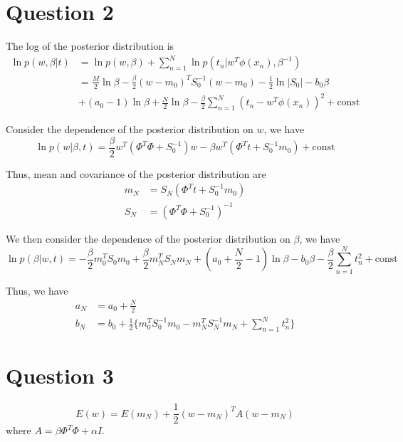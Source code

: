 \documentclass[a4paper,12pt]{article}
\begin{document}
\section*{Question 2}

The log of the posterior distribution is
\begin{align*}
	\ln p(w, \beta | t) &= \ln p(w, \beta) + \sum_{n=1}^{N} \ln p(t_n | w^T \phi(x_n), \beta^{-1}) \\
	&= \frac{M}{2} \ln \beta - \frac{\beta}{2} (w - m_0)^T S_0^{-1} (w - m_0) - \frac{1}{2} \ln |S_0| - b_0 \beta \\
	&+ (a_0 - 1) \ln \beta + \frac{N}{2} \ln \beta - \frac{\beta}{2} \sum_{n=1}^{N} (t_n - w^T \phi(x_n))^2 + \text{const}
\end{align*}

Consider the dependence of the posterior distribution on $w$, we have
\begin{equation*}
	\ln p(w | \beta, t) = \frac{\beta}{2} w^T (\Phi^T \Phi + S_0^{-1}) w - \beta w^T (\Phi^T t + S_0^{-1} m_0) + \text{const}
\end{equation*}

Thus, mean and covariance of the posterior distribution are
\begin{align*}
	m_N &= S_N (\Phi^T t + S_0^{-1} m_0) \\
	S_N &= (\Phi^T \Phi + S_0^{-1})^{-1}
\end{align*}

We then consider the dependence of the posterior distribution on $\beta$, we have
\begin{equation*}
	\ln p(\beta | w, t) = -\frac{\beta}{2} m_0^T S_0 m_0 + \frac{\beta}{2} m_N^T S_N m_N + (a_0 + \frac{N}{2} - 1) \ln \beta - b_0 \beta - \frac{\beta}{2} \sum_{n=1}^{N} t_n^2 + \text{const}
\end{equation*}

Thus, we have
\begin{align*}
	a_N &= a_0 + \frac{N}{2} \\
	b_N &= b_0 + \frac{1}{2} \{ m_0^T S_0^{-1} m_0 - m_N^T S_N^{-1} m_N + \sum_{n=1}^{N} t_n^2 \}
\end{align*}

\section*{Question 3}

\begin{equation*}
	E(w) = E(m_N) + \frac{1}{2} (w - m_N)^T A (w - m_N)
\end{equation*}
where $A = \beta \Phi^T \Phi + \alpha I$.
\end{document}
